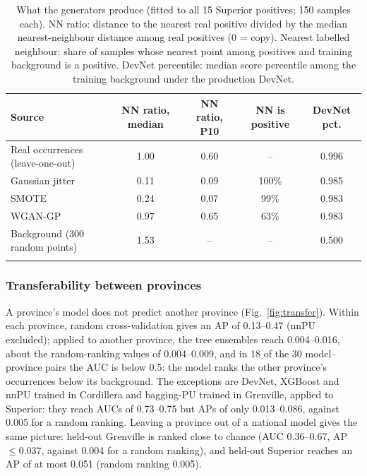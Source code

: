 \documentclass[pdflatex,sn-apa]{sn-jnl}
\begin{document}
\begin{table}[t]
\caption{What the generators produce (fitted to all 15 Superior positives; 150 samples each). NN ratio: distance to the nearest real positive divided by the median nearest-neighbour distance among real positives (0 = copy). Nearest labelled neighbour: share of samples whose nearest point among positives and training background is a positive. DevNet percentile: median score percentile among the training background under the production DevNet.}\label{tab:aug-diag}
\footnotesize
\setlength{\tabcolsep}{2.5pt}
\begin{tabular*}{\textwidth}{@{\extracolsep\fill}lcccc}
\toprule
Source & NN ratio, median & NN ratio, P10 & NN is positive & DevNet pct. \\
\midrule
Real occurrences (leave-one-out) & 1.00 & 0.60 & -- & 0.996 \\
Gaussian jitter & 0.11 & 0.09 & 100\% & 0.985 \\
SMOTE & 0.24 & 0.07 & 99\% & 0.983 \\
WGAN-GP & 0.97 & 0.65 & 63\% & 0.983 \\
Background (300 random points) & 1.53 & -- & -- & 0.500 \\
\botrule
\end{tabular*}
\end{table}

\subsubsection{Transferability between provinces}\label{sec:res-transfer}

A province's model does not predict another province (Fig.~\ref{fig:transfer}). Within each province, random cross-validation gives an AP of 0.13--0.47 (nnPU excluded); applied to another province, the tree ensembles reach 0.004--0.016, about the random-ranking values of 0.004--0.009, and in 18 of the 30 model--province pairs the AUC is below 0.5: the model ranks the other province's occurrences below its background. The exceptions are DevNet, XGBoost and nnPU trained in Cordillera and bagging-PU trained in Grenville, applied to Superior: they reach AUCs of 0.73--0.75 but APs of only 0.013--0.086, against 0.005 for a random ranking. Leaving a province out of a national model gives the same picture: held-out Grenville is ranked close to chance (AUC 0.36--0.67, AP $\leq 0.037$, against 0.004 for a random ranking), and held-out Superior reaches an AP of at most 0.051 (random ranking 0.005).
\end{document}
